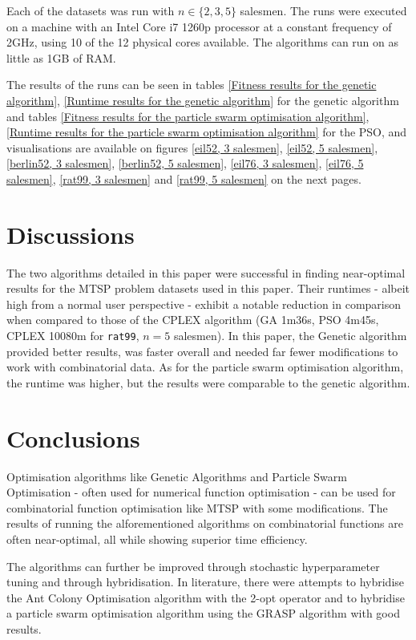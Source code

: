 \documentclass[conference]{IEEEtran}
\begin{document}
Each of the datasets was run with $n \in \{2, 3, 5\}$ salesmen. The runs were executed on a machine with an Intel Core i7
1260p processor at a constant frequency of 2GHz, using 10 of the 12 physical cores available. The algorithms can run on as
little as 1GB of RAM.

The results of the runs can be seen in tables \ref{Fitness results for the genetic algorithm},
\ref{Runtime results for the genetic algorithm} for the genetic algorithm and tables
\ref{Fitness results for the particle swarm optimisation algorithm}, \ref{Runtime results for the particle swarm optimisation algorithm}
for the PSO, and visualisations are available on figures \ref{eil52, 3 salesmen}, \ref{eil52, 5 salesmen}, \ref{berlin52, 3 salesmen},
\ref{berlin52, 5 salesmen}, \ref{eil76, 3 salesmen}, \ref{eil76, 5 salesmen}, \ref{rat99, 3 salesmen} and \ref{rat99, 5 salesmen}
on the next pages.

\section{Discussions}
The two algorithms detailed in this paper were successful in finding near-optimal results for the MTSP problem datasets used
in this paper. Their runtimes - albeit high from a normal user perspective - exhibit a notable reduction in comparison when
compared to those of the CPLEX algorithm (GA 1m36s, PSO 4m45s, CPLEX 10080m for \texttt{rat99}, $n = 5$ salesmen). In this paper,
the Genetic algorithm provided better results, was faster overall and needed far fewer modifications to work with combinatorial
data. As for the particle swarm optimisation algorithm, the runtime was higher, but the results were comparable to the genetic
algorithm.

\section{Conclusions}
Optimisation algorithms like Genetic Algorithms and Particle Swarm Optimisation - often used for numerical function optimisation -
can be used for combinatorial function optimisation like MTSP with some modifications. The results of running the alforementioned
algorithms on combinatorial functions are often near-optimal, all while showing superior time efficiency.

The algorithms can further be improved through stochastic hyperparameter tuning and through hybridisation. In literature, there were
attempts to hybridise the Ant Colony Optimisation algorithm with the 2-opt operator \cite{b12} and to hybridise a particle swarm
optimisation algorithm using the GRASP algorithm \cite{b8} with good results.
\end{document}
